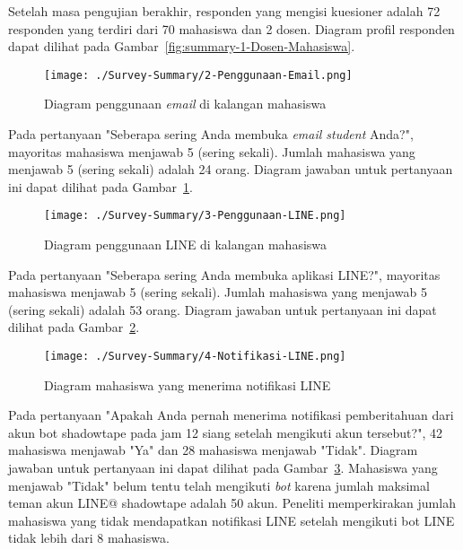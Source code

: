 Setelah masa pengujian berakhir, responden yang mengisi kuesioner adalah 72 responden yang terdiri dari 70 mahasiswa dan 2 dosen. Diagram profil responden dapat dilihat pada Gambar~\ref{fig:summary-1-Dosen-Mahasiswa}.

\begin{figure}[H]
	\centering  
	\texttt{[image: ./Survey-Summary/2-Penggunaan-Email.png]}
	\caption[Diagram penggunaan \textit{email} di kalangan mahasiswa]{Diagram penggunaan \textit{email} di kalangan mahasiswa} 
	\label{fig:summary-2-Penggunaan-Email} 
\end{figure}

Pada pertanyaan "Seberapa sering Anda membuka \textit{email student} Anda?", mayoritas mahasiswa menjawab 5 (sering sekali). Jumlah mahasiswa yang menjawab 5 (sering sekali) adalah 24 orang. Diagram jawaban untuk pertanyaan ini dapat dilihat pada Gambar~\ref{fig:summary-2-Penggunaan-Email}.

\begin{figure}[H]
	\centering  
	\texttt{[image: ./Survey-Summary/3-Penggunaan-LINE.png]}
	\caption[Diagram penggunaan LINE di kalangan mahasiswa]{Diagram penggunaan LINE di kalangan mahasiswa} 
	\label{fig:summary-3-Penggunaan-LINE}
\end{figure}

Pada pertanyaan "Seberapa sering Anda membuka aplikasi LINE?", mayoritas mahasiswa menjawab 5 (sering sekali). Jumlah mahasiswa yang menjawab 5 (sering sekali) adalah 53 orang. Diagram jawaban untuk pertanyaan ini dapat dilihat pada Gambar~\ref{fig:summary-3-Penggunaan-LINE}.

\begin{figure}[H]
	\centering  
	\texttt{[image: ./Survey-Summary/4-Notifikasi-LINE.png]}
	\caption[Diagram mahasiswa yang menerima notifikasi LINE]{Diagram mahasiswa yang menerima notifikasi LINE} 
	\label{fig:summary-4-Notifikasi-LINE} 
\end{figure}

Pada pertanyaan "Apakah Anda pernah menerima notifikasi pemberitahuan dari akun bot shadowtape pada jam 12 siang setelah mengikuti akun tersebut?", 42 mahasiswa menjawab "Ya" dan 28 mahasiswa menjawab "Tidak". Diagram jawaban untuk pertanyaan ini dapat dilihat pada Gambar~\ref{fig:summary-4-Notifikasi-LINE}. Mahasiswa yang menjawab "Tidak" belum tentu telah mengikuti \textit{bot} karena jumlah maksimal teman akun LINE@ shadowtape adalah 50 akun. Peneliti memperkirakan jumlah mahasiswa yang tidak mendapatkan notifikasi LINE setelah mengikuti bot LINE tidak lebih dari 8 mahasiswa.


